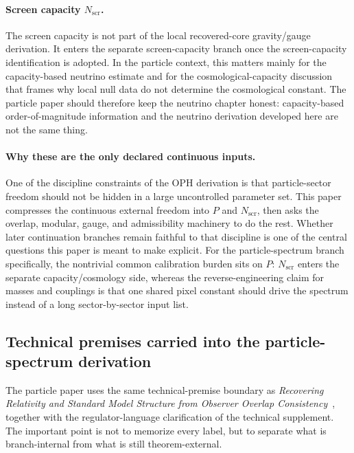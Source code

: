 \documentclass[11pt]{article}
\begin{document}
\paragraph{Screen capacity \(N_{\mathrm{scr}}\).}
The screen capacity is not part of the local recovered-core gravity/gauge derivation. It enters
the separate screen-capacity branch once the screen-capacity identification is adopted. In the
particle context, this matters mainly for the capacity-based neutrino estimate and for the
cosmological-capacity discussion that frames why local null data do not determine the
cosmological constant. The particle paper should therefore keep the neutrino chapter honest:
capacity-based order-of-magnitude information and the neutrino derivation developed here are not the
same thing.

\paragraph{Why these are the only declared continuous inputs.}
One of the discipline constraints of the OPH derivation is that particle-sector freedom should not
be hidden in a large uncontrolled parameter set. This paper compresses the
continuous external freedom into \(P\) and \(N_{\mathrm{scr}}\), then asks the overlap,
modular, gauge, and admissibility machinery to do the rest. Whether later continuation branches
remain faithful to that discipline is one of the central questions this paper is meant to
make explicit. For the particle-spectrum branch specifically, the nontrivial common calibration
burden sits on \(P\): \(N_{\mathrm{scr}}\) enters the separate capacity/cosmology side, whereas
the reverse-engineering claim for masses and couplings is that one shared pixel constant should
drive the spectrum instead of a long sector-by-sector input list.

\subsection{Technical premises carried into the particle-spectrum derivation}

The particle paper uses the same technical-premise boundary as
\emph{Recovering Relativity and Standard Model Structure from Observer Overlap Consistency}~\cite{ophcompact}, together with
the regulator-language clarification of the technical supplement. The important point is not to
memorize every label, but to separate what is branch-internal from what is still theorem-external.
\end{document}
